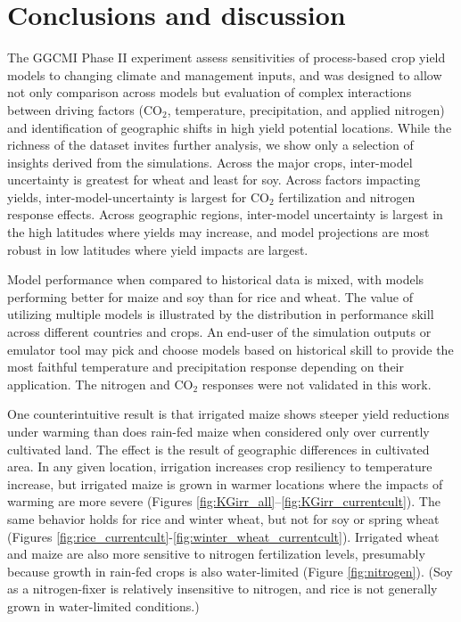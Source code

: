 \documentclass[preprint, 5p, times, twocolumn]{elsarticle}
\begin{document}
\section{Conclusions and discussion} 
\label{S:4}
The GGCMI Phase II experiment assess sensitivities of process-based crop yield models to changing climate and management inputs, and was designed to allow not only comparison across models but evaluation of complex interactions between driving factors (CO$_2$, temperature, precipitation, and applied nitrogen) and identification of geographic shifts in high yield potential locations. While the richness of the dataset invites further analysis, we show only a selection of insights derived from the simulations. Across the major crops, inter-model uncertainty is greatest for wheat and least for soy. Across factors impacting yields, inter-model-uncertainty is largest for CO$_2$ fertilization and nitrogen response effects. Across geographic regions, inter-model uncertainty is largest in the high latitudes where yields may increase, and model projections are most robust in low latitudes where yield impacts are largest.  

Model performance when compared to historical data is mixed, with models performing better for maize and soy than for rice and wheat. The value of utilizing multiple models is illustrated by the distribution in performance skill across different countries and crops. An end-user of the simulation outputs or emulator tool may pick and choose models based on historical skill to provide the most faithful temperature and precipitation response depending on their application. The nitrogen and CO$_2$ responses were not validated in this work.

One counterintuitive result is that irrigated maize shows steeper yield reductions under warming than does rain-fed maize when considered only over currently cultivated land. The effect is the result of geographic differences in cultivated area. In any given location, irrigation increases crop resiliency to temperature increase, but irrigated maize is grown in warmer locations where the impacts of warming are more severe (Figures \ref{fig:KGirr_all}--\ref{fig:KGirr_currentcult}). The same behavior holds for rice and winter wheat, but not for soy or spring wheat (Figures \ref{fig:rice_currentcult}-\ref{fig:winter_wheat_currentcult}). Irrigated wheat and maize are also more sensitive to nitrogen fertilization levels, presumably because growth in rain-fed crops is also water-limited (Figure \ref{fig:nitrogen}). (Soy as a nitrogen-fixer is relatively insensitive to nitrogen, and rice is not generally grown in water-limited conditions.)
\end{document}
